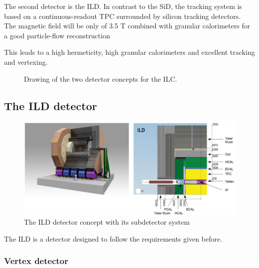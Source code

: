   The second detector is the \acrshort{ILD}.
  In contrast to the \acrshort{SiD}, the tracking system is based on a continuous-readout \acrshort{TPC} surrounded by silicon tracking detectors.
  The magnetic field will be only of 3.5 T combined with granular calorimeters for a good particle-flow reconstruction


  This leads to a high hermeticity, high granular calorimeters and excellent tracking and vertexing. 

    \begin{figure}
      \centering
      \caption{Drawing of the two detector concepts for the ILC.}
      \label{fig:SiD}

    \end{figure}    
    
    \subsection{The ILD detector}
    
    \begin{figure}
      \centering
      \includegraphics[width = 20cm]{Pictures/ild-detector-ilc.jpg}
      \caption{The ILD detector concept with its subdetector system}
      \label{fig:ILD}
    \end{figure}

    The \gls{ILD} is a detector designed to follow the requirements given before.
    

      \subsubsection{Vertex detector}

